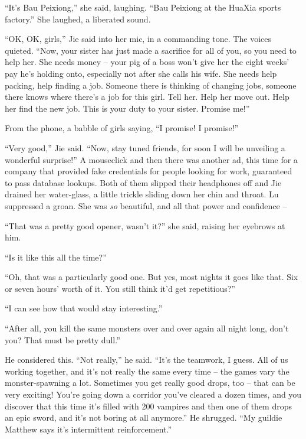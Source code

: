 ``It's Bau Peixiong,'' she said, laughing. ``Bau Peixiong at the
HuaXia sports factory.'' She laughed, a liberated sound.

``OK, OK, girls,'' Jie said into her mic, in a commanding tone. The
voices quieted. ``Now, your sister has just made a sacrifice for all
of you, so you need to help her. She needs money -- your pig of a
boss won't give her the eight weeks' pay he's holding onto,
especially not after she calls his wife. She needs help packing,
help finding a job. Someone there is thinking of changing jobs,
someone there knows where there's a job for this girl. Tell her.
Help her move out. Help her find the new job. This is your duty to
your sister. Promise me!''

From the phone, a babble of girls saying, ``I promise! I promise!''

``Very good,'' Jie said. ``Now, stay tuned friends, for soon I will be
unveiling a wonderful surprise!'' A mouseclick and then there was
another ad, this time for a company that provided fake credentials
for people looking for work, guaranteed to pass database lookups.
Both of them slipped their headphones off and Jie drained her
water-glass, a little trickle sliding down her chin and throat. Lu
suppressed a groan. She was \emph{so} beautiful, and all that power
and confidence --

``That was a pretty good opener, wasn't it?'' she said, raising her
eyebrows at him.

``Is it like this all the time?''

``Oh, that was a particularly good one. But yes, most nights it goes
like that. Six or seven hours' worth of it. You still think it'd
get repetitious?''

``I can see how that would stay interesting.''

``After all, you kill the same monsters over and over again all
night long, don't you? That must be pretty dull.''

He considered this. ``Not really,'' he said. ``It's the teamwork, I
guess. All of us working together, and it's not really the same
every time -- the games vary the monster-spawning a lot. Sometimes
you get really good drops, too -- that can be very exciting! You're
going down a corridor you've cleared a dozen times, and you
discover that this time it's filled with 200 vampires and then one
of them drops an epic sword, and it's not boring at all anymore.''
He shrugged. ``My guildie Matthew says it's intermittent
reinforcement.''

